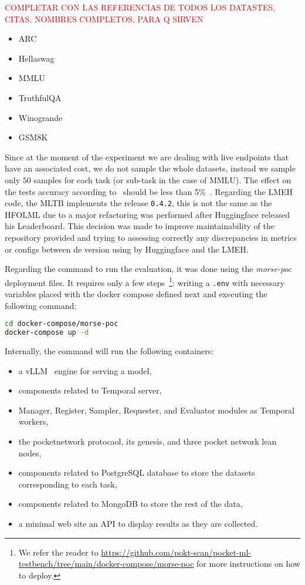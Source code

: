 \textcolor{red}{COMPLETAR CON LAS REFERENCIAS DE TODOS LOS DATASTES, CITAS, NOMBRES COMPLETOS, PARA Q SIRVEN} 

\begin{itemize}[noitemsep]
    \item ARC
    \item Hellaswag
    \item MMLU
    \item TruthfulQA
    \item Winogrande
    \item GSM8K
\end{itemize}

Since at the moment of the experiment we are dealing with live endpoints that have an associated cost, we do not sample the whole datasets, instead we sample only $50$ samples for each task (or sub-task in the case of MMLU). 
The effect on the tests accuracy according to~\citeauthor{polo_tinybenchmarks_2024} should be less than 5\%~\cite{polo_tinybenchmarks_2024}. 
Regarding the \gls{LMEH}~\cite{biderman_lessons_2024} code, the \gls{MLTB} implements the release \verb|0.4.2|, this is not the same as the \gls{HFOLML} due to a major refactoring was performed after Huggingface released his Leaderboard. 
This decision was made to improve maintainability of the repository provided and trying to assessing correctly any discrepancies in metrics or configs between de version using by Huggingface and the \gls{LMEH}. 

Regarding the command to run the evaluation, it was done using the \emph{morse-poc} deployment files. It requires only a few steps~\footnote{We refer the reader to \url{https://github.com/pokt-scan/pocket-ml-testbench/tree/main/docker-compose/morse-poc} for more instructions on how to deploy.}: writing a \verb|.env| with necessary variables placed with the docker compose defined next and executing the following command:
\begin{lstlisting}[language=bash, caption={Command to run the evaluation.}, numbers=none]
cd docker-compose/morse-poc
docker-compose up -d
\end{lstlisting}

Internally, the command will run the following containers:

\begin{itemize}[noitemsep]
    \item a vLLM~\cite{kwon_efficient_2023} engine for serving a model,
    \item components related to Temporal server,
    \item Manager, Register, Sampler, Requester, and Evaluator modules as Temporal workers,
    \item the pocketnetwork protocaol, its genesis, and three pocket network lean nodes,
    \item components related to PostgreSQL database to store the datasets corresponding to each task,
    \item components related to MongoDB to store the rest of the data, 
    \item a minimal web site an API to display results as they are collected.
\end{itemize}


